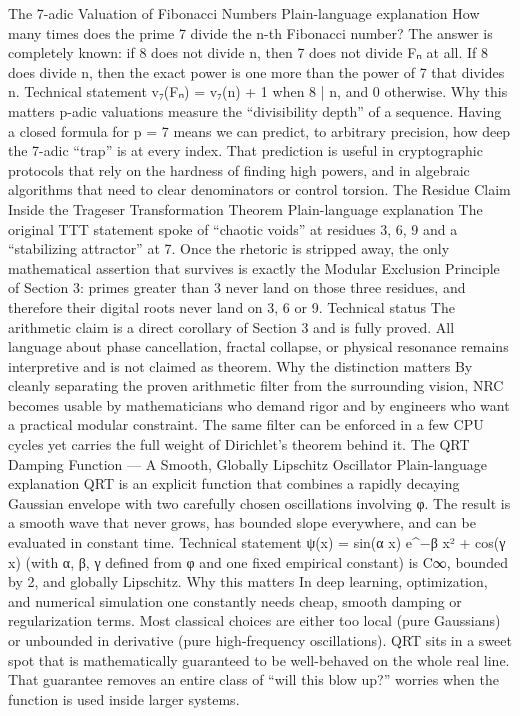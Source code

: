 The 7-adic Valuation of Fibonacci Numbers
Plain-language explanation
How many times does the prime 7 divide the n-th Fibonacci number? The answer is completely known: if 8 does not divide n, then 7 does not divide Fₙ at all. If 8 does divide n, then the exact power is one more than the power of 7 that divides n.
Technical statement
v₇(Fₙ) = v₇(n) + 1 when 8 | n, and 0 otherwise.
Why this matters
p-adic valuations measure the “divisibility depth” of a sequence. Having a closed formula for p = 7 means we can predict, to arbitrary precision, how deep the 7-adic “trap” is at every index. That prediction is useful in cryptographic protocols that rely on the hardness of finding high powers, and in algebraic algorithms that need to clear denominators or control torsion.
The Residue Claim Inside the Trageser Transformation Theorem
Plain-language explanation
The original TTT statement spoke of “chaotic voids” at residues 3, 6, 9 and a “stabilizing attractor” at 7. Once the rhetoric is stripped away, the only mathematical assertion that survives is exactly the Modular Exclusion Principle of Section 3: primes greater than 3 never land on those three residues, and therefore their digital roots never land on 3, 6 or 9.
Technical status
The arithmetic claim is a direct corollary of Section 3 and is fully proved. All language about phase cancellation, fractal collapse, or physical resonance remains interpretive and is not claimed as theorem.
Why the distinction matters
By cleanly separating the proven arithmetic filter from the surrounding vision, NRC becomes usable by mathematicians who demand rigor and by engineers who want a practical modular constraint. The same filter can be enforced in a few CPU cycles yet carries the full weight of Dirichlet’s theorem behind it.
The QRT Damping Function — A Smooth, Globally Lipschitz Oscillator
Plain-language explanation
QRT is an explicit function that combines a rapidly decaying Gaussian envelope with two carefully chosen oscillations involving φ. The result is a smooth wave that never grows, has bounded slope everywhere, and can be evaluated in constant time.
Technical statement
ψ(x) = sin(α x) e^{−β x²} + cos(γ x)
(with α, β, γ defined from φ and one fixed empirical constant) is C∞, bounded by 2, and globally Lipschitz.
Why this matters
In deep learning, optimization, and numerical simulation one constantly needs cheap, smooth damping or regularization terms. Most classical choices are either too local (pure Gaussians) or unbounded in derivative (pure high-frequency oscillations). QRT sits in a sweet spot that is mathematically guaranteed to be well-behaved on the whole real line. That guarantee removes an entire class of “will this blow up?” worries when the function is used inside larger systems.
